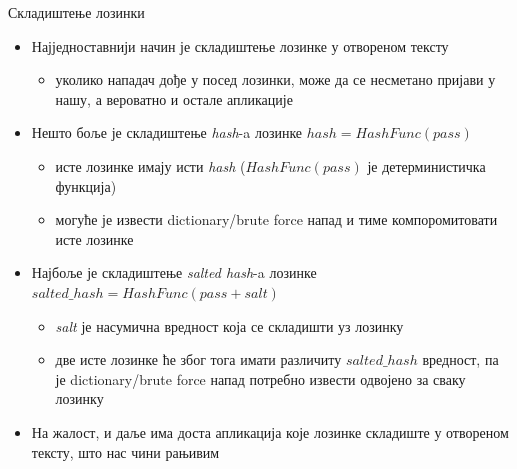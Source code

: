 \documentclass{beamer}
\begin{document}
    \begin{frame}[allowframebreaks]{Складиштење лозинки}
        \begin{itemize}
            \item Најједноставнији начин је складиштење лозинке у отвореном тексту
            \begin{itemize}
                \item уколико нападач дође у посед лозинки, може да се несметано пријави у нашу, а вероватно и остале апликације
            \end{itemize}
            \item Нешто боље је складиштење \textit{hash}-a лозинке \begin{math}hash = HashFunc(pass)\end{math}
            \begin{itemize}
                \item исте лозинке имају исти \textit{hash} (\begin{math}HashFunc(pass)\end{math} је детерминистичка функција)
                \item могуће је извести dictionary/brute force напад и тиме компоромитовати исте лозинке
            \end{itemize}
            
            \framebreak
            
            \item Најбоље је складиштење \textit{salted hash}-a лозинке \begin{math}salted\_hash = HashFunc(pass + salt)\end{math}
            \begin{itemize}
                \item \textit{salt} је насумична вредност која се складишти уз лозинку
                \item две исте лозинке ће због тога имати различиту \begin{math}salted\_hash\end{math} вредност, па је dictionary/brute force напад потребно извести одвојено за сваку лозинку
            \end{itemize}
            \item На жалост, и даље има доста апликација које лозинке складиште у отвореном тексту, што нас чини рањивим
            
            \framebreak
        

\end{itemize}
\end{frame}
\end{document}
